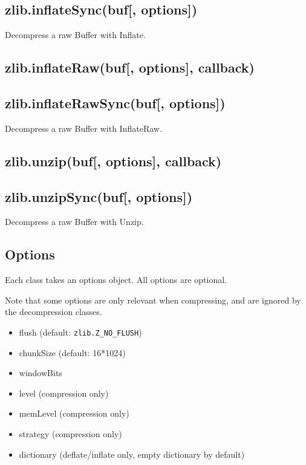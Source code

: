 \subsection{zlib.inflateSync(buf{[},
options{]})}\label{zlib.inflatesyncbuf-options}

Decompress a raw Buffer with Inflate.

\subsection{zlib.inflateRaw(buf{[}, options{]},
callback)}\label{zlib.inflaterawbuf-options-callback}

\subsection{zlib.inflateRawSync(buf{[},
options{]})}\label{zlib.inflaterawsyncbuf-options}

Decompress a raw Buffer with InflateRaw.

\subsection{zlib.unzip(buf{[}, options{]},
callback)}\label{zlib.unzipbuf-options-callback}

\subsection{zlib.unzipSync(buf{[},
options{]})}\label{zlib.unzipsyncbuf-options}

Decompress a raw Buffer with Unzip.

\subsection{Options}\label{options}

Each class takes an options object. All options are optional.

Note that some options are only relevant when compressing, and are
ignored by the decompression classes.

\begin{itemize}
\itemsep1pt\parskip0pt
\item
  flush (default: \texttt{zlib.Z\_NO\_FLUSH})
\item
  chunkSize (default: 16*1024)
\item
  windowBits
\item
  level (compression only)
\item
  memLevel (compression only)
\item
  strategy (compression only)
\item
  dictionary (deflate/inflate only, empty dictionary by default)
\end{itemize}

